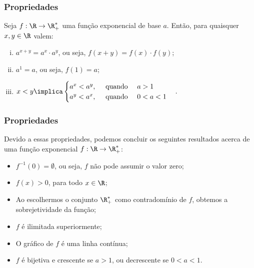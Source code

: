 \documentclass[10pt]{beamer}
\begin{document}

\begin{frame}
\frametitle{Propriedades} 

\begin{proposicao}
Seja $f: \R \to \R_+^\ast$ uma função exponencial de base $a$.
Então, para quaisquer $x, y \in \R$ valem:
\begin{enumerate}[(i)]
	\item  $a^{x+y} = a^x\cdot a^y$, ou seja, $f(x+y) = f(x)\cdot f(y)$;
	\item $a^1 = a$, ou seja, $f(1) = a$;
	\item $x<y \implica \begin{cases} a^x < a^y, \ \ \ \text{ quando } \ \ \ a>1 \\
																		a^y < a^x, \ \ \ \text{ quando } \ \ \ 0<a<1
											 \end{cases}.$
\end{enumerate}
\end{proposicao}




\end{frame}


\begin{frame}
\frametitle{Propriedades} 

Devido a essas propriedades, podemos concluir os seguintes
resultados acerca de uma função exponencial $f: \R \to \R_+^\ast$:
\begin{itemize}
	\item $f^{-1}(0) = \emptyset$, ou seja, $f$ não pode assumir o valor
	zero;
	\item $f(x)>0$, para todo $x \in \R$;
	\item Ao escolhermos o conjunto $\R_+^\ast$ como contradomínio de $f$, obtemos
	a sobrejetividade da função;
	\item $f$ é ilimitada superiormente;
	\item O gráfico de $f$ é uma linha contínua;
	\item $f$ é bijetiva e crescente se $a>1$, ou decrescente se
	$0<a<1$.
\end{itemize}
\end{frame}
\end{document}

